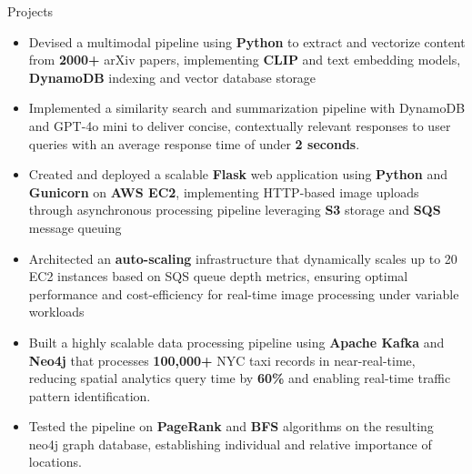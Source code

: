 \documentclass{resume}
\begin{document}
\begin{experienceSection}{Projects}

    \projectItem[
        title=RAG Implementation for arXiv Papers,
        duration={Nov 2024},
    ]
    \begin{itemize}
        \vspace{-0.5em}
        \itemsep -6pt {}
        \item Devised a multimodal pipeline using \textbf{Python} to extract and vectorize content from \textbf{2000+} arXiv papers, implementing \textbf{CLIP} and text embedding models, \textbf{DynamoDB} indexing and vector database storage
        \item Implemented a similarity search and summarization pipeline with DynamoDB and GPT-4o mini to deliver concise, contextually relevant responses to user queries with an average response time of under \textbf{2 seconds}.
    \end{itemize}

    
    \projectItem[
        title=AWS-Based Face Recognition App,
        duration={May 2024},
    ]
    \begin{itemize}
        \vspace{-0.5em}
        \itemsep -6pt {}
        \item Created and deployed a scalable \textbf{Flask} web application using \textbf{Python} and \textbf{Gunicorn} on\textbf{ AWS EC2}, implementing HTTP-based image uploads through asynchronous processing pipeline leveraging \textbf{S3} storage and \textbf{SQS} message queuing
        \item Architected an \textbf{auto-scaling} infrastructure that dynamically scales up to 20 EC2 instances based on SQS queue depth metrics, ensuring optimal performance and cost-efficiency for real-time image processing under variable workloads
    \end{itemize}

    \projectItem[
        title=Kubernetes based Data Processing Pipeline,
        duration={Oct 2024},
    ]
    \begin{itemize}
        \vspace{-0.5em}
        \itemsep -6pt {}
        \item Built a highly scalable data processing pipeline using \textbf{Apache Kafka} and \textbf{Neo4j} that processes \textbf{100,000+} NYC taxi records in near-real-time, reducing spatial analytics query time by \textbf{60\%} and enabling real-time traffic pattern identification.
        \item Tested the pipeline on \textbf{PageRank} and \textbf{BFS} algorithms on the resulting neo4j graph database, establishing individual and relative importance of locations. 


    \end{itemize}


\end{experienceSection}
\end{document}
